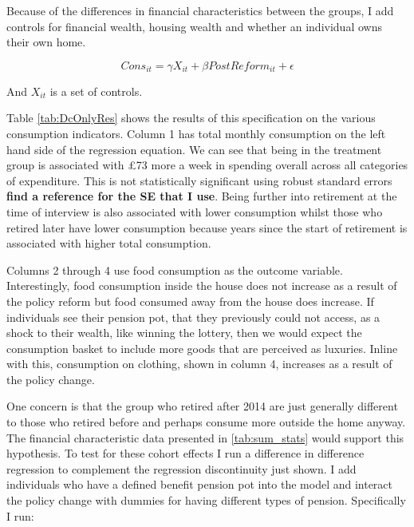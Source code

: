 \documentclass[12pt]{article}
\begin{document}
Because of the differences in financial characteristics between the groups, I add controls for financial wealth, housing wealth
and whether an individual owns their own home.

\begin{equation*}
    Cons_{it} =  \gamma X_{it} + \beta PostReform_{it} + \epsilon
\end{equation*}

And $X_{it}$ is a set of controls.

\begin{landscape}
    
\end{landscape}


Table \ref{tab:DcOnlyRes} shows the results of this specification on the various consumption indicators.
Column 1 has total monthly consumption on the left hand side of the regression equation.
We can see that being in the treatment group is associated with £73 more a week in spending
overall across all categories of expenditure. This is not statistically significant using
robust standard errors \textbf{find a reference for the SE that I use}. Being further into retirement
at the time of interview is also associated with lower consumption whilst those who retired later have lower consumption
because years since the start of retirement is associated with higher total consumption.

Columns 2 through 4 use food consumption as the outcome variable. Interestingly, food consumption
inside the house does not increase as a result of the policy reform but food consumed away from the house does
increase. If individuals see their pension pot, that they previously could not access, as a
shock to their wealth, like winning the lottery, then we would expect the consumption basket to
include more goods that are perceived as luxuries. Inline with this, consumption on clothing, shown in
column 4, increases as a result of the policy change.

One concern is that the group who retired after 2014 are just generally different to those
who retired before and perhaps consume more outside the home anyway. The financial characteristic
data presented in \ref{tab:sum_stats} would support this hypothesis. To test for these cohort
effects I run a difference in difference regression to complement the regression discontinuity just shown.
I add individuals who have a defined benefit pension pot into the model and interact the policy change
with dummies for having different types of pension. Specifically I run:
\end{document}
